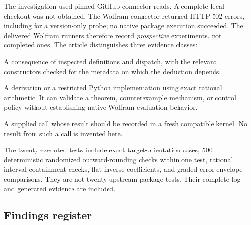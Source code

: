 The investigation used pinned GitHub connector reads. A complete local checkout was not obtained. The Wolfram connector returned HTTP 502 errors, including for a version-only probe; no native package execution succeeded. The delivered Wolfram runners therefore record \emph{prospective} experiments, not completed ones. The article distinguishes three evidence classes:

\begin{description}[style=nextline]
\item[Source deduction.] A consequence of inspected definitions and dispatch, with the relevant constructors checked for the metadata on which the deduction depends.
\item[Independent mathematical/model verification.] A derivation or a restricted Python implementation using exact rational arithmetic. It can validate a theorem, counterexample mechanism, or control policy without establishing native Wolfram evaluation behavior.
\item[Native characterization required.] A supplied call whose result should be recorded in a fresh compatible kernel. No result from such a call is invented here.
\end{description}

The twenty executed tests include exact target-orientation cases, 500 deterministic randomized outward-rounding checks within one test, rational interval containment checks, flat inverse coefficients, and graded error-envelope comparisons. They are not twenty upstream package tests. Their complete log and generated evidence are included.

\subsection{Findings register}

